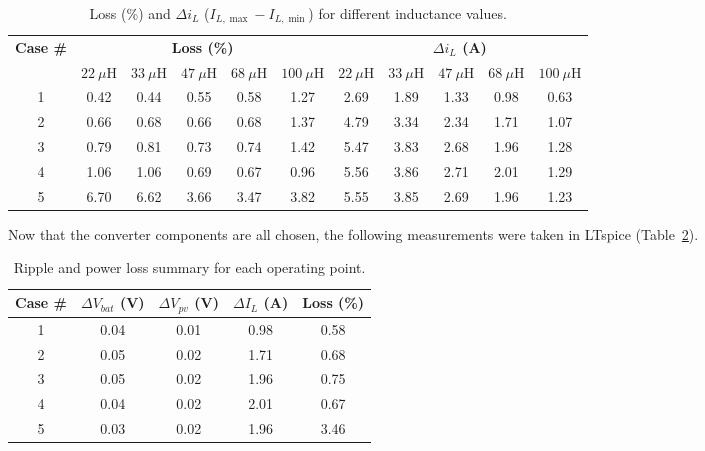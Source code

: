         \begin{table}[!ht]
            \caption{Loss (\%) and $\Delta i_{L}$ ($I_{L,\max}-I_{L,\min}$) for different inductance values.}
            \centering
            \small
            \setlength{\tabcolsep}{4pt}
            \begin{tabular}{|c|ccccc|ccccc|}
            \hline
            \multirow{2}{*}{\textbf{Case \#}} & \multicolumn{5}{c|}{\textbf{Loss (\%)}} & \multicolumn{5}{c|}{\textbf{$\Delta i_{L}$ (A)}} \\
            \cline{2-11}
            & \textbf{$22~\mu\mathrm{H}$} & \textbf{$33~\mu\mathrm{H}$} & \textbf{$47~\mu\mathrm{H}$} & \textbf{$68~\mu\mathrm{H}$} & \textbf{$100~\mu\mathrm{H}$}
            & \textbf{$22~\mu\mathrm{H}$} & \textbf{$33~\mu\mathrm{H}$} & \textbf{$47~\mu\mathrm{H}$} & \textbf{$68~\mu\mathrm{H}$} & \textbf{$100~\mu\mathrm{H}$} \\
            \hline
            1 & 0.42 & 0.44 & 0.55 & 0.58 & 1.27 & 2.69 & 1.89 & 1.33 & 0.98 & 0.63 \\
            2 & 0.66 & 0.68 & 0.66 & 0.68 & 1.37 & 4.79 & 3.34 & 2.34 & 1.71 & 1.07 \\
            3 & 0.79 & 0.81 & 0.73 & 0.74 & 1.42 & 5.47 & 3.83 & 2.68 & 1.96 & 1.28 \\
            4 & 1.06 & 1.06 & 0.69 & 0.67 & 0.96 & 5.56 & 3.86 & 2.71 & 2.01 & 1.29 \\
            5 & 6.70 & 6.62 & 3.66 & 3.47 & 3.82 & 5.55 & 3.85 & 2.69 & 1.96 & 1.23 \\
            \hline
            \end{tabular}
            \label{tab:loss_inductance_2}
            \label{tab:delta_iin_inductance}
        \end{table}

        Now that the converter components are all chosen, the following measurements were taken in LTspice (Table~\ref{tab:ripple_loss}).

        \begin{table}[!ht]
        \centering
        \caption{Ripple and power loss summary for each operating point.}
        \label{tab:ripple_loss}
        \begin{tabular}{|c|cccc|}
        \hline
        \textbf{Case \#} & \textbf{$\Delta V_{bat}$ (V)} & \textbf{$\Delta V_{pv}$ (V)} & \textbf{$\Delta I_{L}$ (A)} & \textbf{Loss (\%)} \\
        \hline
        1 & 0.04 & 0.01 & 0.98 & 0.58 \\
        2 & 0.05 & 0.02 & 1.71 & 0.68 \\
        3 & 0.05 & 0.02 & 1.96 & 0.75 \\
        4 & 0.04 & 0.02 & 2.01 & 0.67 \\
        5 & 0.03 & 0.02 & 1.96 & 3.46 \\
        \hline
        \end{tabular}
        \end{table}


